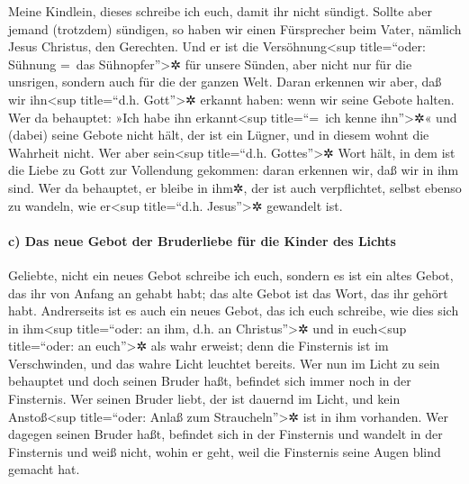  Meine Kindlein, dieses schreibe ich euch, damit ihr nicht
sündigt. Sollte aber jemand (trotzdem) sündigen, so haben wir einen
Fürsprecher beim Vater, nämlich Jesus Christus, den Gerechten.
 Und er ist die Versöhnung\textless sup title=``oder:
Sühnung =~das Sühnopfer''\textgreater✲ für unsere Sünden, aber nicht nur
für die unsrigen, sondern auch für die der ganzen Welt. 
Daran erkennen wir aber, daß wir ihn\textless sup title=``d.h.
Gott''\textgreater✲ erkannt haben: wenn wir seine Gebote halten.
 Wer da behauptet: »Ich habe ihn erkannt\textless sup
title=``=~ich kenne ihn''\textgreater✲« und (dabei) seine Gebote nicht
hält, der ist ein Lügner, und in diesem wohnt die Wahrheit nicht.
 Wer aber sein\textless sup title=``d.h.
Gottes''\textgreater✲ Wort hält, in dem ist die Liebe zu Gott zur
Vollendung gekommen: daran erkennen wir, daß wir in ihm sind.
 Wer da behauptet, er bleibe in ihm✲, der ist auch
verpflichtet, selbst ebenso zu wandeln, wie er\textless sup title=``d.h.
Jesus''\textgreater✲ gewandelt ist.

\hypertarget{c-das-neue-gebot-der-bruderliebe-fuxfcr-die-kinder-des-lichts}{%
\paragraph{c) Das neue Gebot der Bruderliebe für die Kinder des
Lichts}\label{c-das-neue-gebot-der-bruderliebe-fuxfcr-die-kinder-des-lichts}}

 Geliebte, nicht ein neues Gebot schreibe ich euch,
sondern es ist ein altes Gebot, das ihr von Anfang an gehabt habt; das
alte Gebot ist das Wort, das ihr gehört habt.  Andrerseits
ist es auch ein neues Gebot, das ich euch schreibe, wie dies sich in
ihm\textless sup title=``oder: an ihm, d.h. an Christus''\textgreater✲
und in euch\textless sup title=``oder: an euch''\textgreater✲ als wahr
erweist; denn die Finsternis ist im Verschwinden, und das wahre Licht
leuchtet bereits.  Wer nun im Licht zu sein behauptet und
doch seinen Bruder haßt, befindet sich immer noch in der Finsternis.
 Wer seinen Bruder liebt, der ist dauernd im Licht, und
kein Anstoß\textless sup title=``oder: Anlaß zum
Straucheln''\textgreater✲ ist in ihm vorhanden.  Wer
dagegen seinen Bruder haßt, befindet sich in der Finsternis und wandelt
in der Finsternis und weiß nicht, wohin er geht, weil die Finsternis
seine Augen blind gemacht hat.

